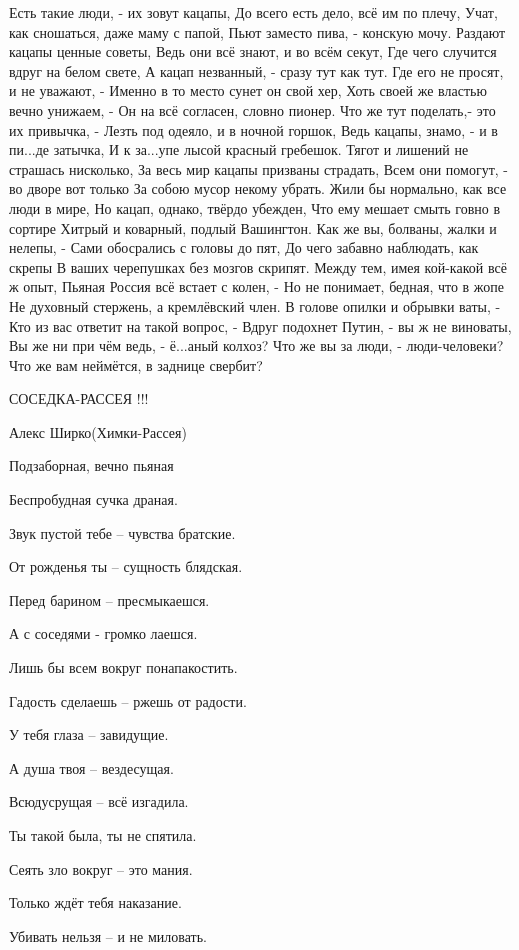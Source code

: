 Есть такие люди, - их зовут кацапы, До всего есть дело, всё им по плечу, Учат,
как сношаться, даже маму с папой, Пьют заместо пива, - конскую мочу. Раздают
кацапы ценные советы, Ведь они всё знают, и во всём секут, Где чего случится
вдруг на белом свете, А кацап незванный, - сразу тут как тут. Где его не
просят, и не уважают, - Именно в то место сунет он свой хер, Хоть своей же
властью вечно унижаем, - Он на всё согласен, словно пионер. Что же тут
поделать,- это их привычка, - Лезть под одеяло, и в ночной горшок, Ведь кацапы,
знамо, - и в пи...де затычка, И к за...упе лысой красный гребешок. Тягот и
лишений не страшась нисколько, За весь мир кацапы призваны страдать, Всем они
помогут, - во дворе вот только За собою мусор некому убрать. Жили бы нормально,
как все люди в мире, Но кацап, однако, твёрдо убежден, Что ему мешает смыть
говно в сортире Хитрый и коварный, подлый Вашингтон. Как же вы, болваны, жалки
и нелепы, - Сами обосрались с головы до пят, До чего забавно наблюдать, как
скрепы В ваших черепушках без мозгов скрипят. Между тем, имея кой-какой всё ж
опыт, Пьяная Россия всё встает с колен, - Но не понимает, бедная, что в жопе Не
духовный стержень, а кремлёвский член. В голове опилки и обрывки ваты, - Кто из
вас ответит на такой вопрос, - Вдруг подохнет Путин, - вы ж не виноваты, Вы же
ни при чём ведь, - ё...аный колхоз? Что же вы за люди, - люди-человеки? Что же
вам неймётся, в заднице свербит?

СОСЕДКА-РАССЕЯ !!!

Алекс Ширко(Химки-Рассея)

Подзаборная, вечно пьяная

Беспробудная сучка драная.

Звук пустой тебе – чувства братские.

От рожденья ты – сущность блядская.

Перед барином – пресмыкаешся.

А с соседями - громко лаешся.

Лишь бы всем вокруг понапакостить.

Гадость сделаешь – ржешь от радости.

У тебя глаза – завидущие.

А душа твоя – вездесущая.

Всюдусрущая – всё изгадила.

Ты такой была, ты не спятила.

Сеять зло вокруг – это мания.

Только ждёт тебя наказание.

Убивать нельзя – и не миловать.

